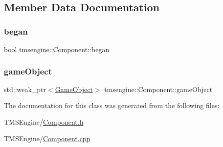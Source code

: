 \subsection{Member Data Documentation}
\mbox{\label{classtmsengine_1_1_component_a95d8db246b91bef1abcdbb9a38607526}} 
\subsubsection{\texorpdfstring{began}{began}}
{\footnotesize\ttfamily bool tmsengine\+::\+Component\+::began\hspace{0.3cm}{\ttfamily [private]}}

\mbox{\label{classtmsengine_1_1_component_aa7aaf22a0b308873a2ae755d8b653553}} 
\subsubsection{\texorpdfstring{game\+Object}{gameObject}}
{\footnotesize\ttfamily std\+::weak\+\_\+ptr$<$\hyperlink{classtmsengine_1_1_game_object}{Game\+Object}$>$ tmsengine\+::\+Component\+::game\+Object\hspace{0.3cm}{\ttfamily [private]}}



The documentation for this class was generated from the following files\+:\begin{DoxyCompactItemize}
\item 
T\+M\+S\+Engine/\hyperlink{_component_8h}{Component.\+h}\item 
T\+M\+S\+Engine/\hyperlink{_component_8cpp}{Component.\+cpp}\end{DoxyCompactItemize}
